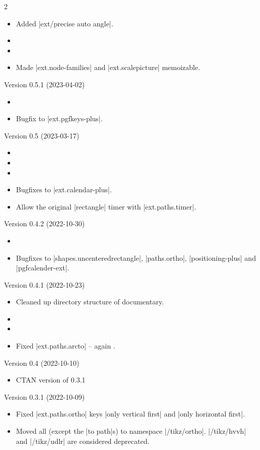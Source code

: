 \begin{multicols}{2}
\begin{itemize}
\item Added |ext/precise auto angle|.
\item {}
\item {}
\item Made |ext.node-families| and |ext.scalepicture| memoizable.
\end{itemize}
Version 0.5.1 (2023-04-02)
\begin{itemize}
\item {}
\item Bugfix to |ext.pgfkeys-plus|. \cite{GH6}
\end{itemize}
Version 0.5 (2023-03-17)
\begin{itemize}
\item {}
\item {}
\item {}
\item Bugfixes to |ext.calendar-plus|.
\item Allow the original |rectangle| timer with |ext.paths.timer|.
\end{itemize}
Version 0.4.2 (2022-10-30)
\begin{itemize}
\item {}
\item Bugfixes to |shapes.uncenteredrectangle|, |paths.ortho|, |positioning-plus| and |pgfcalender-ext|.
\end{itemize}
Version 0.4.1 (2022-10-23)
\begin{itemize}
\item Cleaned up directory structure of documentary.
\item {}
\item {}
\item Fixed |ext.paths.arcto| -- again \cite{GH2}.
\end{itemize}
Version 0.4 (2022-10-10)
\begin{itemize}
\item CTAN version of 0.3.1
\end{itemize}
Version 0.3.1 (2022-10-09)
\begin{itemize}
\item Fixed |ext.paths.ortho| keys |only vertical first| and |only horizontal first|.
\item Moved all (except the |to path|s) to namespace |/tikz/ortho|.
     |/tikz/hvvh| and |/tikz/udlr| are considered deprecated.

\end{itemize}
\end{multicols}
